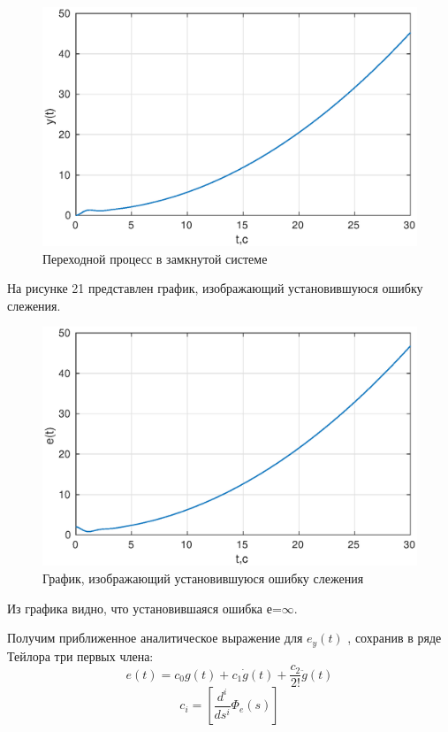 \documentclass[12pt,a4paper]{article}
\begin{document}
\begin{figure}[H]
\centering
\includegraphics[width=\textwidth]{1/4_1y(t).eps}
\caption{Переходной процесс в замкнутой системе}
\end{figure}

На рисунке 21 представлен график, изображающий  установившуюся ошибку слежения.
\begin{figure}[H]
\centering
\includegraphics[width=\textwidth]{1/4_1e(t).eps}
\caption{График, изображающий  установившуюся ошибку слежения}
\end{figure}

Из графика видно, что установившаяся ошибка е=${\infty}$.

Получим приближенное аналитическое выражение для $e_{y}(t)$ , сохранив в ряде Тейлора три первых члена:
\begin{equation}
e(t)=c_{0}g(t)+c_{1}\dot{g}(t)+\frac{c_{2}}{2!}\ddot{g}(t)
\end{equation}
\begin{equation}
c_{i}=[\frac{d^i}{ds^i}\Phi_{e}(s)]
\end{equation}
		
\end{document}

